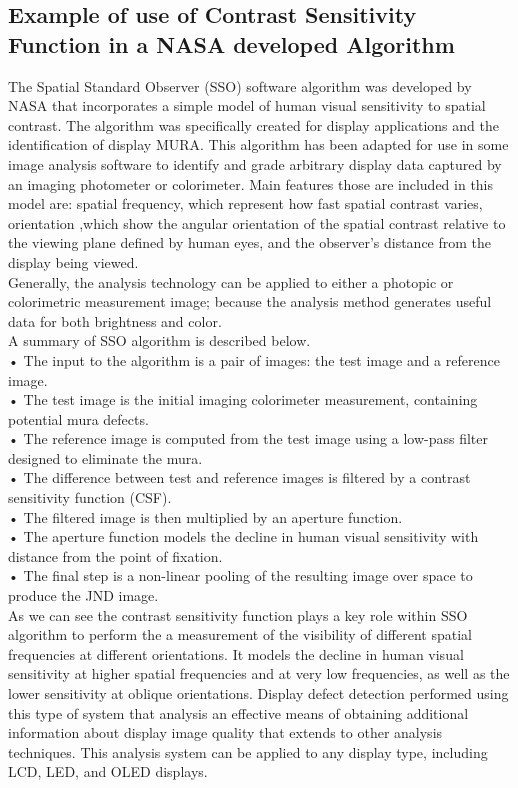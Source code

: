 \documentclass{article}
\begin{document}
\subsection{Example of use of Contrast Sensitivity Function in a NASA developed Algorithm}
The Spatial Standard Observer (SSO) software algorithm was developed by NASA that incorporates a simple model of human visual sensitivity to spatial contrast. The algorithm was specifically created for display applications and the identification of display MURA. This algorithm has been adapted for use in some image analysis software to identify and grade arbitrary display data
captured by an imaging photometer or colorimeter. Main features those are included in this model are: spatial frequency, which represent how fast spatial contrast varies, orientation ,which show the angular orientation of the spatial contrast relative to the viewing plane defined by human eyes, and the observer’s distance from the display being viewed. \\
Generally, the analysis technology can be applied to either a photopic or colorimetric measurement image; because the analysis method generates useful data for both brightness and color.\\
A summary of SSO algorithm is described below.\\
• The input to the algorithm is a pair of images: the test image and a reference image.\\
• The test image is the initial imaging colorimeter measurement, containing potential
mura defects.\\
• The reference image is computed from the test image using a low-pass filter
designed to eliminate the mura.\\
• The difference between test and reference images is filtered by a contrast sensitivity
function (CSF).\\
• The filtered image is then multiplied by an aperture function.\\
• The aperture function models the decline in human visual sensitivity with
distance from the point of fixation.\\
• The final step is a non-linear pooling of the resulting image over space to produce the
JND image.\\

As we can see the contrast sensitivity function plays a key role within SSO algorithm to perform the a measurement of the visibility of different spatial frequencies at different orientations. It models the decline in human visual sensitivity at higher spatial frequencies and at very low frequencies, as well as the lower sensitivity at oblique orientations.
Display defect detection performed using this type of system that analysis an effective means of obtaining additional information about display image quality that extends to other analysis techniques. This analysis system can be applied
to any display type, including LCD, LED, and OLED displays.
\end{document}
